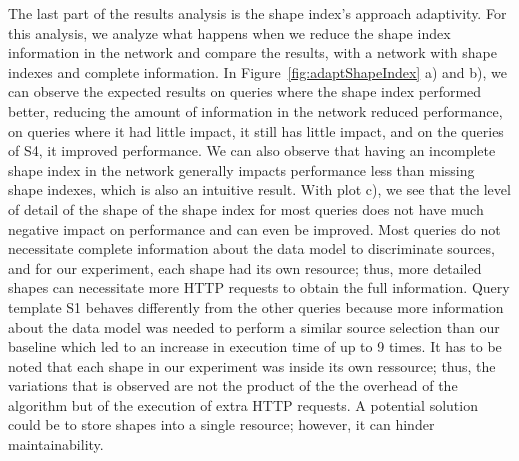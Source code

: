 The last part of the results analysis is the shape index's approach adaptivity.
For this analysis, we analyze what happens when we reduce the shape index information in the network and compare the results,
with a network with shape indexes and complete information.
In Figure~\ref{fig:adaptShapeIndex} a) and b), we can observe the expected results on queries 
where the shape index performed better, reducing the amount of information in the network reduced performance,
on queries where it had little impact, it still has little impact, and on the queries of S4, it improved performance.
We can also observe that having an incomplete shape index in the network generally impacts performance less than
missing shape indexes, which is also an intuitive result.
With plot c), we see that the level of detail of the shape of the shape index for most queries does not have much negative impact on performance and can even be improved.
Most queries do not necessitate complete information about the data model to discriminate sources, and for our experiment, each shape
had its own resource; thus, more detailed shapes can necessitate more HTTP requests to obtain the full information.
Query template S1 behaves differently from the other queries because more information about the data model was needed to perform a similar source selection than our baseline
which led to an increase in execution time of up to 9 times.
It has to be noted that each shape in our experiment was inside its own ressource; thus, the variations that is observed are not the product of the 
the overhead of the algorithm but of the execution of extra HTTP requests.
A potential solution could be to store shapes into a single resource; however, it can hinder maintainability.  